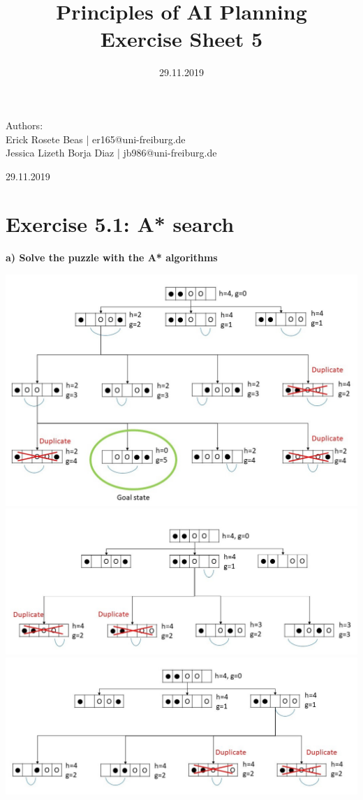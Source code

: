 \documentclass[12pt,a4paper]{article}
\title{\textbf{Principles of AI Planning
		\\{\Large Exercise Sheet 5}}}
\date{29.11.2019}
\begin{document}
	\begin{flushleft}
		Authors:\\
		Erick Rosete Beas | er165@uni-freiburg.de\\
		Jessica Lizeth Borja Diaz | jb986@uni-freiburg.de\\
	\end{flushleft}
	{\let\newpage\relax\maketitle}
	\begin{center} 
		\large 29.11.2019 
	\end{center}

\hfill\break
\section*{Exercise 5.1: A* search}
	\textbf{a) Solve the puzzle with the A* algorithms}\\
	\begin{center}
		\includegraphics[scale=0.4]{A_star_0.jpg}\\
		\includegraphics[scale=0.4]{A_star_1.jpg}\\
		\includegraphics[scale=0.4]{A_star_2.jpg}\\
	\end{center}
\end{document}
